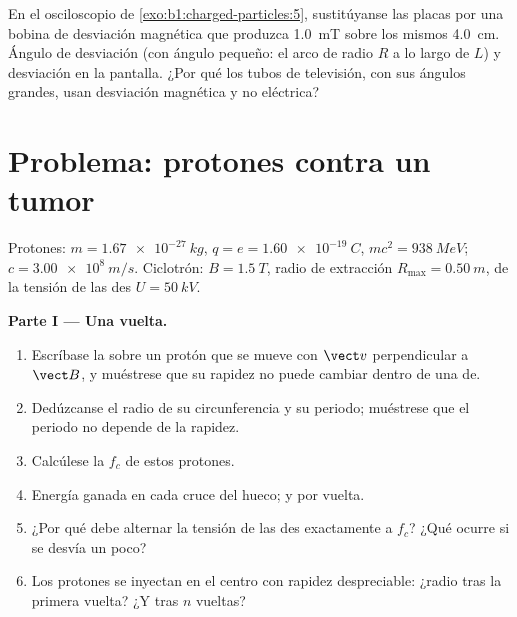 \begin{exercise}[$\star\star\star$]\label{exo:b1:charged-particles:12}
En el osciloscopio de \cref{exo:b1:charged-particles:5}, sustitúyanse las
placas por una bobina de desviación magnética que produzca \qty{1.0}{mT}
sobre los mismos \qty{4.0}{cm}. Ángulo de desviación (con ángulo pequeño:
el arco de radio $R$ a lo largo de $L$) y desviación en la pantalla. ¿Por
qué los tubos de televisión, con sus ángulos grandes, usan desviación
magnética y no eléctrica?
\end{exercise}

\section{Problema: protones contra un tumor}

\begin{problem}
\label{pb:b1:charged-particles:1}
Protones: $m = \qty{1.67e-27}{kg}$, $q = e = \qty{1.60e-19}{C}$, $mc^2 =
\qty{938}{MeV}$; $c = \qty{3.00e8}{m/s}$. Ciclotrón: $B = \qty{1.5}{T}$,
radio de extracción $R_{\max} = \qty{0.50}{m}$,  de la tensión de
las des $U = \qty{50}{kV}$.

\medskip
\noindent\textbf{Parte I --- Una vuelta.}
\begin{enumerate}
  \item Escríbase la  sobre un protón que se mueve con
        $\vect v$ perpendicular a $\vect B$, y muéstrese que su rapidez no
        puede cambiar dentro de una de.
  \item Dedúzcanse el radio de su circunferencia y su periodo; muéstrese
        que el periodo no depende de la rapidez.
  \item Calcúlese la  $f_c$ de estos protones.
  \item Energía ganada en cada cruce del hueco; y por vuelta.
  \item ¿Por qué debe alternar la tensión de las des exactamente a $f_c$?
        ¿Qué ocurre si se desvía un poco?
  \item Los protones se inyectan en el centro con rapidez despreciable:
        ¿radio tras la primera vuelta? ¿Y tras $n$ vueltas?
\end{enumerate}


\end{problem}
